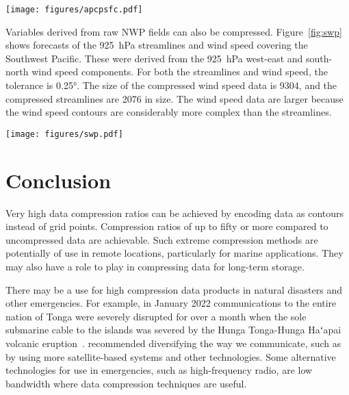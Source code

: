 \documentclass[12pt,a4paper]{article}
\newcommand{\f}{{\fontspec{LibertinusSerif}ʻ}}
\begin{document}
\begin{figure*}
\centering
\texttt{[image: figures/apcpsfc.pdf]}
\caption{\label{fig:rain}\SI{24}{\hour} rainfall accumulation.}
\end{figure*}

Variables derived from raw NWP fields can also be compressed.
Figure~\ref{fig:swp} shows forecasts of the \SI{925}{\hecto\Pa} streamlines and
wind speed covering the Southwest Pacific. These were derived from the
\SI{925}{\hecto\Pa} west-east and south-north wind speed components. For both
the streamlines and wind speed, the tolerance is \ang{0.25}. The size of the
compressed wind speed data is \SI{9304}{\byte}, and the compressed streamlines
are \SI{2076}{\byte} in size. The wind speed data are larger because the wind
speed contours are considerably more complex than the streamlines.

\begin{figure*}
\centering
\texttt{[image: figures/swp.pdf]}
\caption{\label{fig:swp}\SI{24}{\hour} forecast of \SI{925}{\hecto\Pa}
stream function and wind speed for the Southwest Pacific valid
for 1200\,UTC, 5 January 2023. Wind speed units are knots.}
\end{figure*}

\section*{Conclusion}
\label{sec:conclusion}

Very high data compression ratios can be achieved by encoding data as contours
instead of grid points. Compression ratios of up to fifty or more compared to
uncompressed data are achievable. Such extreme compression methods are
potentially of use in remote locations, particularly for marine applications.
They may also have a role to play in compressing data for long-term storage.

There may be a use for high compression data products in natural disasters and
other emergencies. For example, in January 2022 communications to the
entire nation of Tonga were severely disrupted for over a month when the sole
submarine cable to the islands was severed by the Hunga Tonga-Hunga Ha\f apai
volcanic eruption~\citep{dominey-howes2022}. \citeauthor{dominey-howes2022}
recommended diversifying the way we communicate, such as by using more
satellite-based systems and other technologies. Some alternative
technologies for use in emergencies, such as high-frequency radio, are low
bandwidth where data compression techniques are useful.
\end{document}
